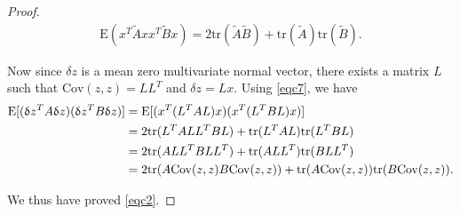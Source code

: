 \documentclass[article,ij4uq]{ij4uq}              %
\begin{document}
\begin{proof}
\begin{align}
    \mathrm{E}(x^{T}\tilde{A}xx^{T}\tilde{B}x)=2\mathrm{tr}(\tilde{A}\tilde{B})+\mathrm{tr}(\tilde{A})\mathrm{tr}(\tilde{B}).\label{eqc7}
\end{align}
\par Now since $\delta z$ is a mean zero multivariate normal vector, there exists a matrix $L$ such that $\mathrm{Cov}(z,z)=LL^{T}$ and $\delta z=Lx$. Using \eqref{eqc7}, we have
\begin{align}
    \mathrm{E}[(\delta z^{T}A\delta z)(\delta z^{T}B\delta z)]&=\mathrm{E}[(x^{T}(L^{T}AL)x)(x^{T}(L^{T}BL)x)]\notag\\
    &=2\mathrm{tr}(L^{T}ALL^{T}BL)+\mathrm{tr}(L^{T}AL)\mathrm{tr}(L^{T}BL)\notag\\
    &=2\mathrm{tr}(ALL^{T}BLL^{T})+\mathrm{tr}(ALL^{T})\mathrm{tr}(BLL^{T})\notag\\
    &=2\mathrm{tr}(A\mathrm{Cov}(z,z)B\mathrm{Cov}(z,z))+\mathrm{tr}(A\mathrm{Cov}(z,z))\mathrm{tr}(B\mathrm{Cov}(z,z)).\label{eqc8}
\end{align}
\par We thus have proved \eqref{eqc2}.

\end{proof}
\end{document}
